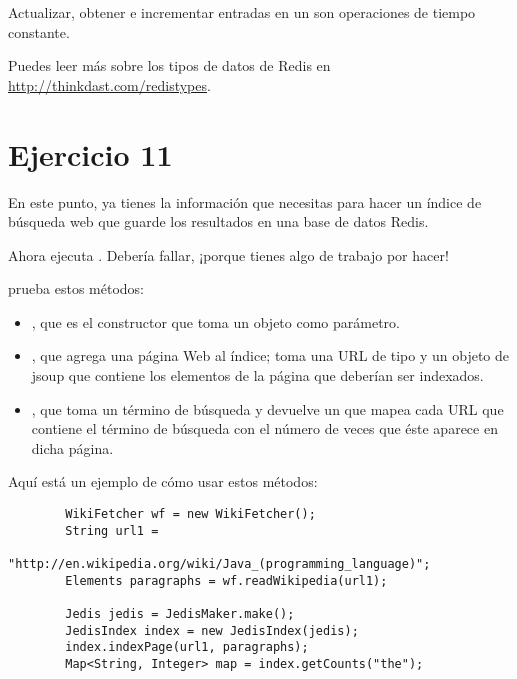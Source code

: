 \documentclass[12pt]{book}
\theoremstyle{exercise}
\begin{document}
Actualizar, obtener e incrementar entradas en un  son operaciones de
tiempo constante.


Puedes leer más sobre los tipos de datos de Redis en
\url{http://thinkdast.com/redistypes}.


\section{Ejercicio 11}
\label{exercise11}

En este punto, ya tienes la información que necesitas para hacer un índice
de búsqueda web que guarde los resultados en una base de datos Redis.


Ahora ejecuta . Debería
fallar, ¡porque tienes algo de trabajo por hacer!

 prueba estos métodos:

\begin{itemize}

\item
  , que es el constructor que toma un
  objeto  como parámetro.

\item
  , que agrega una página Web al índice; toma una URL de
  tipo  y un objeto  de jsoup que contiene los
  elementos de la página que deberían ser indexados.

\item
  , que toma un término de búsqueda y devuelve un
   que mapea cada
  URL que contiene el término de búsqueda con el número de veces que
  éste aparece en dicha página.

\end{itemize}

Aquí está un ejemplo de cómo usar estos métodos:

\begin{verbatim}
        WikiFetcher wf = new WikiFetcher();
        String url1 = 
            "http://en.wikipedia.org/wiki/Java_(programming_language)";
        Elements paragraphs = wf.readWikipedia(url1);

        Jedis jedis = JedisMaker.make();
        JedisIndex index = new JedisIndex(jedis);
        index.indexPage(url1, paragraphs);
        Map<String, Integer> map = index.getCounts("the");
\end{verbatim}
\end{document}
